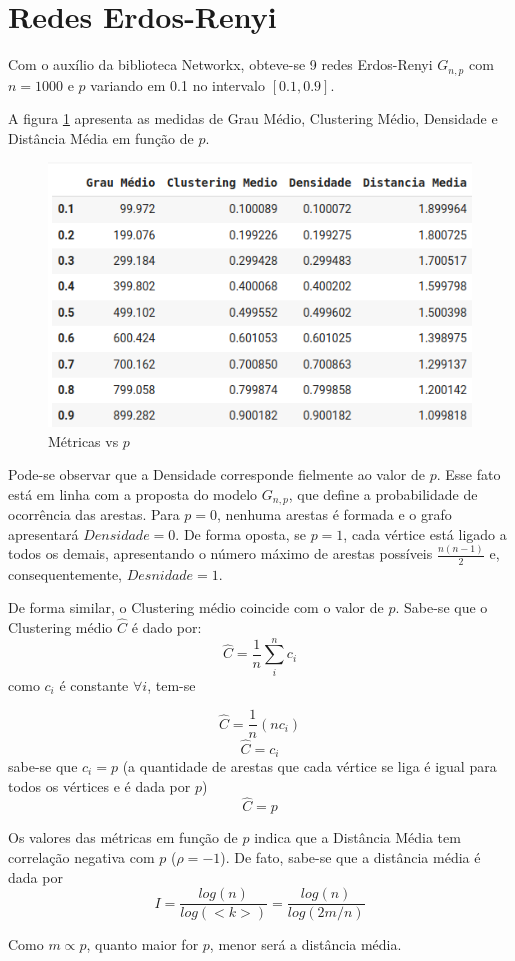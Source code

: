 \documentclass[12pt]{article}
\begin{document}
\newpage

\section{Redes Erdos-Renyi}
Com o auxílio da biblioteca Networkx, obteve-se 9 redes Erdos-Renyi $G_{n, p}$ com $n = 1000$ e $p$ variando em 0.1 no intervalo $\left[ 0.1, 0.9\right]$. 

A figura \ref{metricasvsp} apresenta as medidas de Grau Médio, Clustering Médio, Densidade e Distância Média em função de $p$.  

\begin{figure}[h!]
    \centering
    \includegraphics[width=0.5\linewidth]{valores_obtidos.png}
    \caption{Métricas vs $p$}
    \label{metricasvsp}
\end{figure}

Pode-se observar que a Densidade corresponde fielmente ao valor de $p$. Esse fato está em linha com a proposta do modelo $G_{n,p}$, que define a probabilidade de ocorrência das arestas. Para $p = 0$, nenhuma arestas é formada e o grafo apresentará $Densidade  = 0$. De forma oposta, se $p=1$, cada vértice está ligado a todos os demais, apresentando o número máximo de arestas possíveis $\frac{n(n-1)}{2}$ e, consequentemente, $Desnidade = 1$. 


De forma similar, o Clustering médio coincide com o valor de $p$. Sabe-se que o Clustering médio $\hat{C}$ é dado por: 
$$\hat{C} = \frac{1}{n}\sum_i^n c_i$$
como $c_i$ é constante $\forall i$, tem-se 

$$\hat{C} = \frac{1}{n}(nc_i)$$
$$\hat{C} = c_i$$
sabe-se que $c_i = p$ (a quantidade de arestas que cada vértice se liga é igual para todos os vértices e é dada por $p$)
$$\hat{C} = p$$

Os valores das métricas em função de $p$ indica que a Distância Média tem correlação negativa com $p$ ($\rho = -1$). De fato, sabe-se que a distância média é dada por 
$$I = \frac{log (n)}{log (<k> )} = \frac{log(n)}{log (2m/n)}$$

Como $m \propto p$, quanto maior for $p$, menor será a distância média.  
\end{document}
